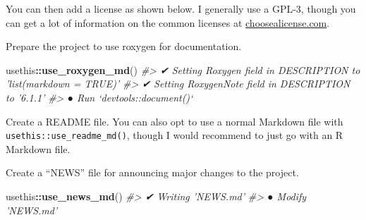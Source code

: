 \documentclass[]{book}
\newenvironment{Shaded}{\begin{snugshade}}{\end{snugshade}}
\newcommand{\CommentTok}[1]{\textcolor[rgb]{0.56,0.35,0.01}{\textit{#1}}}
\newcommand{\DataTypeTok}[1]{\textcolor[rgb]{0.13,0.29,0.53}{#1}}
\newcommand{\KeywordTok}[1]{\textcolor[rgb]{0.13,0.29,0.53}{\textbf{#1}}}
\newcommand{\NormalTok}[1]{#1}
\newcommand{\OperatorTok}[1]{\textcolor[rgb]{0.81,0.36,0.00}{\textbf{#1}}}
\newcommand{\StringTok}[1]{\textcolor[rgb]{0.31,0.60,0.02}{#1}}
\begin{document}
You can then add a license as shown below. I generally use a GPL-3, though you can get a lot of information on the common licenses at \href{https://choosealicense.com}{choosealicense.com}.

\begin{Shaded}
\end{Shaded}

Prepare the project to use roxygen for documentation.

\begin{Shaded}
\begin{Highlighting}[]
\NormalTok{usethis}\OperatorTok{::}\KeywordTok{use_roxygen_md}\NormalTok{()}
\CommentTok{#> ✔ Setting Roxygen field in DESCRIPTION to 'list(markdown = TRUE)'}
\CommentTok{#> ✔ Setting RoxygenNote field in DESCRIPTION to '6.1.1'}
\CommentTok{#> ● Run `devtools::document()`}
\end{Highlighting}
\end{Shaded}

Create a README file. You can also opt to use a normal Markdown file with \texttt{usethis::use\_readme\_md()}, though I would recommend to just go with an R Markdown file.

\begin{Shaded}
\end{Shaded}

Create a ``NEWS'' file for announcing major changes to the project.

\begin{Shaded}
\begin{Highlighting}[]
\NormalTok{usethis}\OperatorTok{::}\KeywordTok{use_news_md}\NormalTok{()}
\CommentTok{#> ✔ Writing 'NEWS.md'}
\CommentTok{#> ● Modify 'NEWS.md'}
\end{Highlighting}
\end{Shaded}
\end{document}
